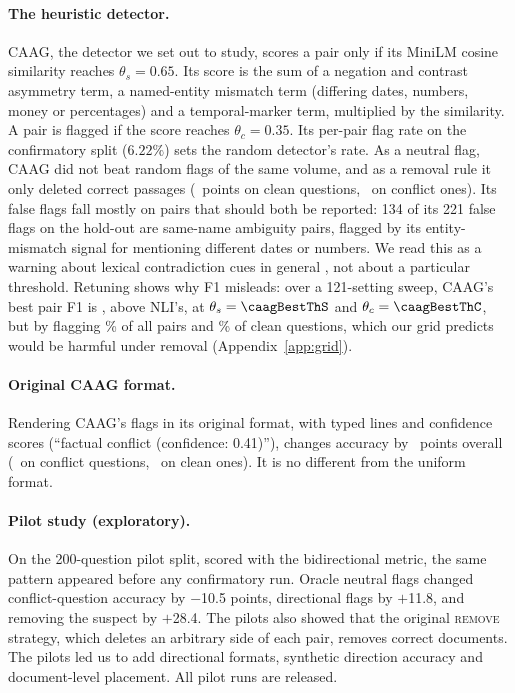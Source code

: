 \paragraph{The heuristic detector.}
CAAG, the detector we set out to study, scores a pair only if its MiniLM \citep{reimers2019sbert} cosine similarity reaches $\theta_s=0.65$. Its score
is the sum of a negation and contrast asymmetry term, a named-entity mismatch term (differing dates, numbers, money or
percentages) and a temporal-marker term, multiplied by the similarity. A pair is flagged if the score reaches
$\theta_c=0.35$. Its per-pair flag rate on the confirmatory split ($6.22\%$) sets the random detector's rate.
As a neutral flag, CAAG did not beat random flags of the same volume, and
as a removal rule it only deleted correct passages (\dCaagRemClean\ points on clean questions, \dCaagRemConf\ on
conflict ones). Its false flags fall mostly on pairs that should both be reported: 134 of its 221 false flags on the
hold-out are same-name ambiguity pairs, flagged by its entity-mismatch signal for mentioning different dates or
numbers. We read this as a warning about lexical contradiction cues in general \citep{gururangan2018annotation},
not about a particular threshold. Retuning shows why F1 misleads: over a 121-setting sweep, CAAG's
best pair F1 is \caagBestFOne, above NLI's, at $\theta_s=\caagBestThS$ and $\theta_c=\caagBestThC$, but by flagging \caagBestRate\% of all pairs and \caagBestCleanFpr\% of clean questions, which our grid predicts
would be harmful under removal (Appendix~\ref{app:grid}).

\paragraph{Original CAAG format.}
Rendering CAAG's flags in its original format, with typed lines and confidence scores (``factual conflict (confidence:
0.41)''), changes accuracy by \origCaagAll\ points overall (\origCaagConf\ on conflict questions, \origCaagClean\ on
clean ones). It is no different from the uniform format.

\paragraph{Pilot study (exploratory).}
On the 200-question pilot split, scored with the bidirectional metric, the same pattern appeared before any
confirmatory run. Oracle neutral flags changed conflict-question accuracy by $-$10.5 points, directional flags by
$+$11.8, and removing the suspect by $+$28.4. The pilots also showed that the original \textsc{remove} strategy,
which deletes an arbitrary side of each pair, removes correct documents. The pilots led us to add directional formats,
synthetic direction accuracy and document-level placement. All pilot runs are released.

